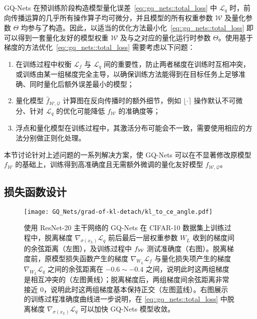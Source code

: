 GQ-Nets 在预训练阶段构造模型量化误差~\eqref{eq::gq_nets::total_loss} 中 $\mathcal{L}_q$ 时，前向传播运算的几乎所有操作算子均可微分，并且模型的所有权重参数 $\mathcal{W}$ 及量化参数 $\Theta$ 均参与了构造。因此，以适当的优化方法最小化~\eqref{eq::gq_nets::total_loss} 即可以得到一套量化友好的模型权重 $\mathcal{W}$ 及与之对应的量化运行时参数 $\Theta$。使用基于梯度的方法优化~\eqref{eq::gq_nets::total_loss} 需要考虑以下问题：
\begin{enumerate}[1)]
  \item 在训练过程中权衡 $\mathcal{L}_f$ 与 $\mathcal{L}_q$ 间的重要性，防止两者梯度在训练时互相冲突，或训练由某一组梯度完全主导，以确保训练方法能得到在目标任务上足够准确、同时量化后额外误差最小的模型；
  \item 量化模型 $\hat{f}_{\mathcal{W, Q}}$ 计算图在反向传播时的额外细节，例如 $\lfloor\cdot\rceil$ 操作默认不可微分、针对 $\mathcal{L}_q$ 的优化可能降低 $f_{\mathcal{W}}$ 的准确度等；
  \item 浮点和量化模型在训练过程中，其激活分布可能会不一致，需要使用相应的方法分别做正则化处理。
\end{enumerate}
本节讨论针对上述问题的一系列解决方案，使 GQ-Nets 可以在不显著修改原模型 $f_{\mathcal{W}}$ 的基础上，训练得到高准确度且无需额外微调的量化友好模型 $f_{\mathcal{W, Q}}$。
\subsection{损失函数设计} \label{sec::gq_nets::loss_func}

\begin{figure}[htb]
  \centering
  \texttt{[image: GQ\_Nets/grad-of-kl-detach/kl\_to\_ce\_angle.pdf]}
  \caption{使用 ResNet-20 主干网络的 GQ-Nets 在 CIFAR-10 数据集上训练过程中，脱离梯度 $\nabla_{\sigma(x_L)}\mathcal{L}_q$ 前后最后一层权重参数 $W_L$ 收到的梯度间的余弦距离（左图），及训练过程中 $f_{\mathcal{W}}$ 测试准确度（右图）。脱离梯度前，原模型损失函数产生的梯度 $\nabla_{W_L}\mathcal{L}_f$ 与量化损失项产生的梯度 $\nabla_{W_L}\mathcal{L}_q$ 之间的余弦距离在 $-0.6 \sim -0.4$ 之间，说明此时这两组梯度是相互冲突的（左图黄线）；脱离梯度后，两组梯度间余弦距离非常接近 0，说明此时这两组梯度基本保持正交（左图蓝线）。右图展示的训练过程准确度曲线进一步说明，在 \eqref{eq::gq_nets::total_loss} 中脱离梯度 $\nabla_{\sigma(x_L)}\mathcal{L}_q$ 可以加快 GQ-Nets 模型收敛。}
  \label{img::gq_nets::detach_grad_cos}
\end{figure}

